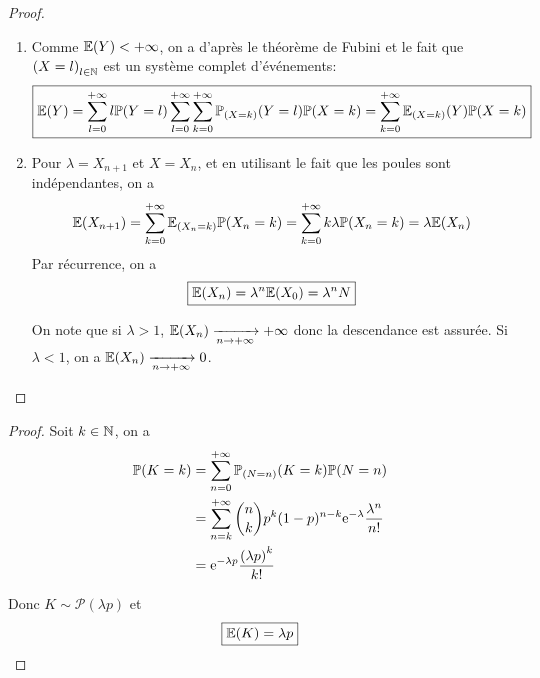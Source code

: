 \documentclass[12pt]{article}
\begin{document}
\begin{proof}
    \phantom{}
    \begin{enumerate}
        \item Comme $\mathbb{E}(Y)<+\infty$, on a d'après le théorème de Fubini et le fait que $\left(X=l\right)_{l\in\mathbb{N}}$ est un système complet d'événements:
        \begin{equation}
            \boxed{\mathbb{E}(Y)=\sum_{l=0}^{+\infty}l\mathbb{P}(Y=l)\sum_{l=0}^{+\infty}\sum_{k=0}^{+\infty}\mathbb{P}_{(X=k)}(Y=l)\mathbb{P}(X=k)=\sum_{k=0}^{+\infty}\mathbb{E}_{(X=k)}(Y)\mathbb{P}(X=k)}
        \end{equation}

        \item Pour $\lambda=X_{n+1}$ et $X=X_{n}$, et en utilisant le fait que les poules sont indépendantes, on a 
        \begin{equation}
            \mathbb{E}(X_{n+1})=\sum_{k=0}^{+\infty}\mathbb{E}_{(X_{n}=k)}\mathbb{P}(X_{n}=k)=\sum_{k=0}^{+\infty}k\lambda\mathbb{P}(X_{n}=k)=\lambda\mathbb{E}(X_{n})
        \end{equation}
        Par récurrence, on a 
        \begin{equation}
            \boxed{\mathbb{E}(X_{n})=\lambda^{n}\mathbb{E}(X_{0})=\lambda^{n}N}
        \end{equation}

        On note que si $\lambda>1$, $\mathbb{E}(X_{n})\xrightarrow[n\to+\infty]{}+\infty$ donc la descendance est assurée. Si $\lambda<1$, on a $\mathbb{E}(X_{n})\xrightarrow[n\to+\infty]{}0$.
    \end{enumerate}
\end{proof}

\begin{proof}
    Soit $k\in\mathbb{N}$, on a 
    \begin{align}
        \mathbb{P}(K=k)
        &=\sum_{n=0}^{+\infty}\mathbb{P}_{(N=n)}(K=k)\mathbb{P}(N=n)\\
        &=\sum_{n=k}^{+\infty}\binom{n}{k}p^{k}(1-p)^{n-k}\mathrm{e}^{-\lambda}\frac{\lambda^{n}}{n!}\\
        &=\mathrm{e}^{-\lambda p}\frac{\left(\lambda p\right)^{k}}{k!}
    \end{align}

    Donc $K\sim\mathcal{P}(\lambda p)$ et 
    \begin{equation}
        \boxed{\mathbb{E}(K)=\lambda p}
    \end{equation}
\end{proof}
\end{document}

